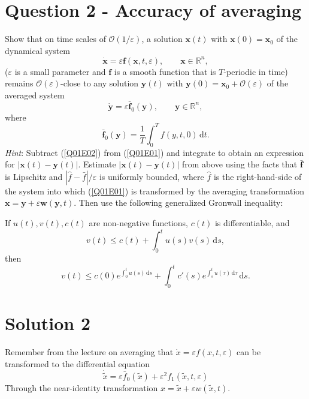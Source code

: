 \documentclass[twoside,10pt,a4paper]{article}
\begin{document}
\newpage

\section*{Question 2 - Accuracy of averaging}
Show that on time scales of $\mathcal{O}(1/\varepsilon)$, a solution $\mathbf{x}(t)$ with $\mathbf{x}(0) = \mathbf{x}_0$ of the dynamical system
\begin{equation}\label{Q01E01}
	\dot{\mathbf{x}} = \varepsilon \mathbf{f}(\mathbf{x},t, \varepsilon), \qquad \mathbf{x} \in \mathbb{R}^n,
\end{equation}
($\varepsilon$ is a small parameter and $\mathbf{f}$ is a smooth function that is $T$-periodic in time) remains $\mathcal{O}(\varepsilon)$-close to any solution $\mathbf{y}(t)$ with $\mathbf{y}(0) = \mathbf{x}_0 + \mathcal{O}(\varepsilon)$ of the averaged system
\begin{equation}\label{Q01E02}
	\dot{\mathbf{y}} = \varepsilon \bar{\mathbf{f}}_0 (\mathbf{y}), \qquad \mathbf{y} \in \mathbb{R}^n,
\end{equation}
where
\begin{equation*}
	\bar{\mathbf{f}}_0 (\mathbf{y}) = \frac{1}{T} \int_0^T f(y,t,0) \, \text{d}t.
\end{equation*}
\textit{Hint}: Subtract (\ref{Q01E02}) from (\ref{Q01E01}) and integrate to obtain an expression for $|\mathbf{x}(t) - \mathbf{y}(t)|$. Estimate $|\mathbf{x}(t) - \mathbf{y}(t)|$ from above using the facts that $\bar{\mathbf{f}}$ is Lipschitz and $|\hat{f} - \bar{f}|/\varepsilon$ is uniformly bounded, where $\hat{f}$ is the right-hand-side of the system into which (\ref{Q01E01}) is transformed by the averaging transformation $\mathbf{x} = \mathbf{y} + \varepsilon \mathbf{w}(\mathbf{y},t)$. Then use the following generalized Gronwall inequality:

If $u(t), v(t), c(t)$ are non-negative functions, $c(t)$ is differentiable, and
\begin{equation*}
	v(t) \leq c(t) + \int_0^t u(s)v(s) \, \text{d}s,
\end{equation*}
then
\begin{equation*}
	v(t) \leq c(0) e^{\int_0^t u(s)\, \text{d}s} + \int_0^t c'(s)e^{\int_s^t u(\tau)\,\text{d}\tau}\, \text{d}s.
\end{equation*}

\section*{Solution 2}
Remember from the lecture on averaging that $\dot{x} = \varepsilon f(x,t, \varepsilon)$ can be transformed to the differential equation
\begin{equation}\label{S05E021}
	\dot{\tilde{x}} = \varepsilon \bar{f}_0(\tilde{x}) + \varepsilon^2f_1(\tilde{x},t,\varepsilon)
\end{equation}
Through the near-identity transformation $x = \tilde{x} + \varepsilon w(\tilde{x},t)$.
\end{document}
